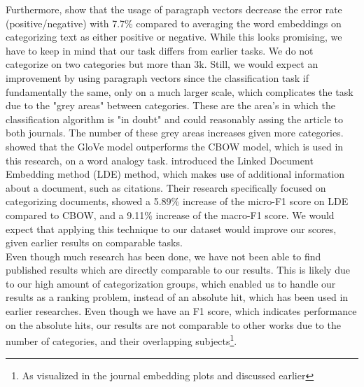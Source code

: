 \documentclass[../../Thesis.tex]{subfiles}
\begin{document}
Furthermore, \citet{le2014distributed} show that the usage of paragraph vectors decrease the error rate (positive/negative) with 7.7\% compared to averaging the word embeddings on categorizing text as either positive or negative. While this looks promising, we have to keep in mind that our task differs from earlier tasks. We do not categorize on two categories but more than 3k. Still, we would expect an improvement by using paragraph vectors since the classification task if fundamentally the same, only on a much larger scale, which complicates the task due to the "grey areas"  between categories. These are the area's in which the classification algorithm is "in doubt" and could reasonably assing the article to both journals. The number of these grey areas increases given more categories. \citet{pennington2014glove} showed that the GloVe model outperforms the CBOW model, which is used in this research, on a word analogy task. \citet{wang2016linked} introduced the Linked Document Embedding method (LDE) method, which makes use of additional information about a document, such as citations. Their research specifically focused on categorizing documents, showed a 5.89\% increase of the micro-F1 score on LDE compared to CBOW, and a 9.11\% increase of the macro-F1 score. We would expect that applying this technique to our dataset would improve our scores, given earlier results on comparable tasks.\\
Even though much research has been done, we have not been able to find published results which are directly comparable to our results. This is likely due to our high amount of categorization groups, which enabled us to handle our results as a ranking problem, instead of an absolute hit, which has been used in earlier researches\cite{wang2016linked}. Even though we have an F1 score, which indicates performance on the absolute hits, our results are not comparable to other works due to the number of categories, and their overlapping subjects\footnote{As visualized in the journal embedding plots and discussed earlier}.
\end{document}
